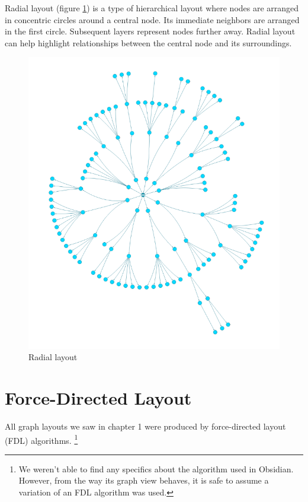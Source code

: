 Radial layout (figure \ref{obr:graph_layout_radial}) is a type of hierarchical layout where nodes are arranged in concentric circles around a central node.
Its immediate neighbors are arranged in the first circle. Subsequent layers represent nodes further away.
Radial layout can help highlight relationships between the central node and its surroundings.

\begin{figure}[p]\centering
    \includegraphics[width=140mm, keepaspectratio]{img/graph_layout_radial.png}
    \caption{Radial layout\cite{graph_layout_demos}}
    \label{obr:graph_layout_radial}
\end{figure}

\section{Force-Directed Layout}
All graph layouts we saw in chapter 1 were produced by force-directed layout (FDL) algorithms.
\footnote{We weren't able to find any specifics about the algorithm used in Obsidian.
However, from the way its graph view behaves, it is safe to assume a variation of an FDL algorithm was used.}

